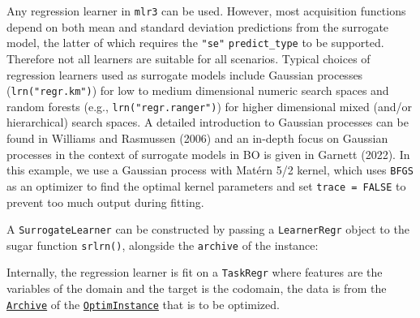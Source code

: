 Any regression learner in \texttt{mlr3} can be used. However, most
acquisition functions depend on both mean and standard deviation
predictions from the surrogate model, the latter of which requires the
\texttt{"se"} \texttt{predict\_type} to be supported. Therefore not all
learners are suitable for all scenarios. Typical choices of regression
learners used as surrogate models include Gaussian
processes (\texttt{lrn("regr.km")}) for low to
medium dimensional numeric search spaces and random
forests (e.g., \texttt{lrn("regr.ranger")}) for
higher dimensional mixed (and/or hierarchical) search spaces. A detailed
introduction to Gaussian processes can be found in Williams and
Rasmussen (2006) and an in-depth focus on Gaussian processes in the
context of surrogate models in BO is given in Garnett (2022). In this
example, we use a Gaussian process with Matérn 5/2 kernel, which uses
\texttt{BFGS} as an optimizer to find the optimal kernel parameters and
set \texttt{trace\ =\ FALSE} to prevent too much output during fitting.

\begin{Shaded}
\begin{Highlighting}[]
\OtherTok{=} \NormalTok{(}\NormalTok{, } \NormalTok{, } \NormalTok{,}
   \NormalTok{(} \NormalTok{))}
\end{Highlighting}
\end{Shaded}

A \texttt{SurrogateLearner} can be constructed by passing a
\texttt{LearnerRegr} object to the sugar function
\texttt{srlrn()},
alongside the \texttt{archive} of the instance:

\begin{Shaded}
\begin{Highlighting}[]
\OtherTok{=} \SpecialCharTok{$}
\end{Highlighting}
\end{Shaded}

Internally, the regression learner is fit on a \texttt{TaskRegr} where
features are the variables of the domain and the target is the codomain,
the data is from the
\href{https://bbotk.mlr-org.com/reference/Archive.html}{\texttt{Archive}}
of the
\href{https://bbotk.mlr-org.com/reference/OptimInstance.html}{\texttt{OptimInstance}}
that is to be optimized.


